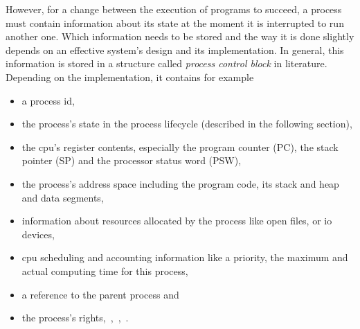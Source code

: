 However, for a change between the execution of programs to succeed, a process must contain information about its state at the moment it is interrupted to run another one.
Which information needs to be stored and the way it is done slightly depends on an effective system's design and its implementation.
In general, this information is stored in a structure called \textit{process control block} in literature\cite{tanenbaum-modern-operating-systems}.
Depending on the implementation, it contains for example
\begin{itemize}
    \item a process id, 
    \item the process's state in the process lifecycle (described in the following section),
    \item the \ac{cpu}'s register contents, especially the program counter (PC), the stack pointer (SP) and the processor status word (PSW),
    \item the process's address space including the program code, its stack and heap and data segments, 
    \item information about resources allocated by the process like open files, or \ac{io} devices,
    \item \ac{cpu} scheduling and accounting information like a priority, the maximum and actual computing time for this process,
    \item a reference to the parent process and
    \item the process's rights\cite{tanenbaum-modern-operating-systems},~\cite{glatz2015betriebssysteme},~\cite{achilles2006betriebssysteme},~\cite{silberschatz2009operating}.
\end{itemize}

